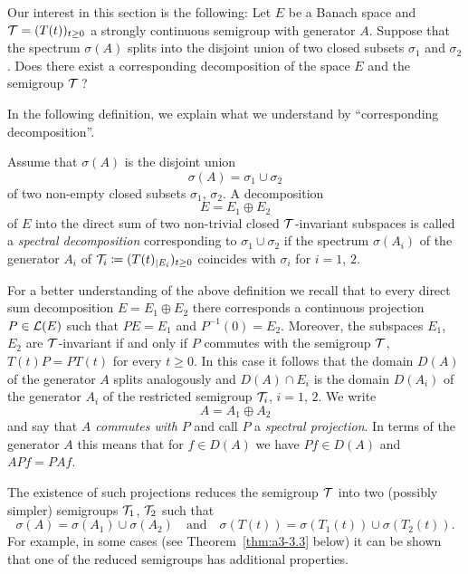 Our interest in this section is the following: Let $E$ be a Banach space and $\TT = (T(t))_{t \geq 0}$ a strongly continuous semigroup with generator $A$.
Suppose that the spectrum $\sigma(A)$ splits into the disjoint union of two closed subsets $\sigma_{1}$ and $\sigma_{2}$.
Does there exist a corresponding decomposition of the space $E$ and the semigroup $\mathcal{T}$\,?

In the following definition, we explain what we understand by \enquote{corresponding decomposition}.
\begin{definition}\label{def:a3-3.1}
Assume that $\sigma(A)$ is the disjoint union
\[
\sigma(A) = \sigma_{1} \cup \sigma_{2}
\]
of two non-empty closed subsets $\sigma_{1}$, $\sigma_{2}$.
A decomposition
\[
E = E_{1} \oplus E_{2}
\]
of\/ $E$ into the direct sum of two non-trivial closed $\mathcal{T}$-invariant subspaces is called a \emph{spectral decomposition} corresponding to $\sigma_{1} \cup \sigma_{2}$ if the spectrum $\sigma(A_{i})$ of the generator $A_{i}$ of\/ $\TT_{i} \coloneq (T(t)_{|E_{i}})_{t \geq 0}$ coincides with $\sigma_{i}$ for $i = 1$, $2$.
\end{definition}
For a better understanding of the above definition we recall that to every direct sum decomposition $E = E_{1} \oplus E_{2}$ there corresponds a continuous projection $P \in \mathcal{L}(E)$ such that $PE = E_{1}$ and $P^{-1}(0) = E_{2}$.
Moreover, the subspaces $E_{1}$, $E_{2}$ are $\mathcal{T}$-invariant if and only if\/ $P$ commutes with the semigroup $\mathcal{T}$, \ie $T(t)P = PT(t)$ for every $t \geq 0$.
In this case it follows that the domain $D(A)$ of the generator $A$ splits analogously and $D(A) \cap E_{i}$ is the domain $D(A_{i})$ of the generator $A_{i}$ of the restricted semigroup $\mathcal{T}_{i}$, $i = 1$, $2$.
We write
\[
A = A_{1} \oplus A_{2} 
\]
and say that \emph{$A$ commutes with $P$} and call $P$ a \emph{spectral projection}. 
In terms of the generator $A$ this means that for $f \in D(A)$ we have $Pf \in D(A)$ and $APf = PAf$.

The existence of such projections reduces the semigroup $\mathcal{T}$ into two (possibly simpler) semigroups $\mathcal{T}_{1}$, $\mathcal{T}_{2}$ such that
\[
\sigma(A) = \sigma(A_{1}) \cup \sigma(A_{2}) \quad \text{and} \quad \sigma(T(t)) = \sigma(T_{1}(t)) \cup \sigma(T_{2}(t)) .
\]
For example, in some cases (see Theorem~\ref{thm:a3-3.3} below) it can be shown that one of the reduced semigroups has additional properties.

